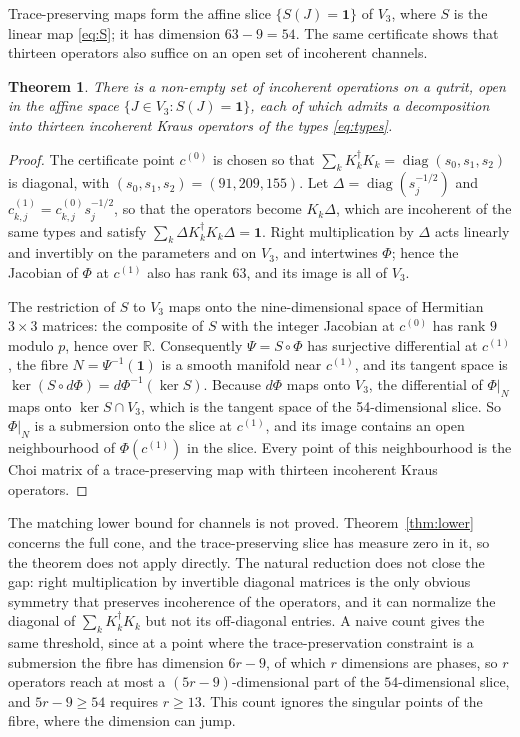 \documentclass[11pt,a4paper]{article}
\newtheorem{theorem}{Theorem}
\theoremstyle{definition}
\theoremstyle{plain}
\newcommand{\one}{\mathbf{1}}
\newcommand{\R}{\mathbb{R}}
\begin{document}
Trace-preserving maps form the affine slice $\{S(J)=\one\}$ of $V_3$, where $S$
is the linear map \eqref{eq:S}; it has dimension $63-9=54$. The same
certificate shows that thirteen operators also suffice on an open set of
incoherent channels.

\begin{theorem}\label{thm:channels}
There is a non-empty set of incoherent operations on a qutrit, open in the
affine space $\{J\in V_3: S(J)=\one\}$, each of which admits a decomposition
into thirteen incoherent Kraus operators of the types \eqref{eq:types}.
\end{theorem}
\begin{proof}
The certificate point $c^{(0)}$ is chosen so that
$\sum_kK_k^\dagger K_k=\operatorname{diag}(s_0,s_1,s_2)$ is diagonal, with
$(s_0,s_1,s_2)=(91,209,155)$. Let $\Delta=\operatorname{diag}(s_j^{-1/2})$
and $c^{(1)}_{k,j}=c^{(0)}_{k,j}s_j^{-1/2}$, so that the operators become
$K_k\Delta$, which are incoherent of the same types and satisfy
$\sum_k\Delta K_k^\dagger K_k\Delta=\one$. Right multiplication by $\Delta$
acts linearly and invertibly on the parameters and on $V_3$, and intertwines
$\Phi$; hence the Jacobian of $\Phi$ at $c^{(1)}$ also has rank $63$, and its
image is all of $V_3$.

The restriction of $S$ to $V_3$ maps onto the nine-dimensional space of
Hermitian $3\times3$ matrices: the composite of $S$ with the integer Jacobian
at $c^{(0)}$ has rank $9$ modulo $p$, hence over $\R$. Consequently
$\Psi=S\circ\Phi$ has surjective differential at $c^{(1)}$, the fibre
$N=\Psi^{-1}(\one)$ is a smooth manifold near $c^{(1)}$, and its tangent space
is $\ker(S\circ d\Phi)=d\Phi^{-1}(\ker S)$. Because $d\Phi$ maps onto $V_3$,
the differential of $\Phi|_N$ maps onto $\ker S\cap V_3$, which is the tangent
space of the 54-dimensional slice. So $\Phi|_N$ is a submersion onto the slice
at $c^{(1)}$, and its image contains an open neighbourhood of $\Phi(c^{(1)})$
in the slice. Every point of this neighbourhood is the Choi matrix of a
trace-preserving map with thirteen incoherent Kraus operators.
\end{proof}

The matching lower bound for channels is not proved. Theorem~\ref{thm:lower}
concerns the full cone, and the trace-preserving slice has measure zero in it,
so the theorem does not apply directly. The natural reduction does not close
the gap: right multiplication by invertible diagonal matrices is the only
obvious symmetry that preserves incoherence of the operators, and it can
normalize the diagonal of $\sum_kK_k^\dagger K_k$ but not its off-diagonal
entries. A naive count gives the same threshold, since at a point where the
trace-preservation constraint is a submersion the fibre has dimension
$6r-9$, of which $r$ dimensions are phases, so $r$ operators reach at most a
$(5r-9)$-dimensional part of the $54$-dimensional slice, and $5r-9\ge54$
requires $r\ge13$. This count ignores the singular points of the fibre, where
the dimension can jump.
\end{document}
